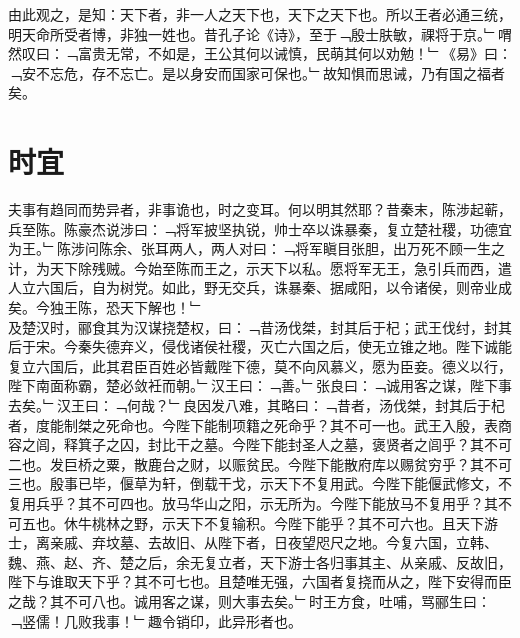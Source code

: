 由此观之，是知：天下者，非一人之天下也，天下之天下也。所以王者必通三统，明天命所受者博，非独一姓也。昔孔子论《诗》，至于﹁殷士肤敏，祼将于京。﹂喟然叹曰：﹁富贵无常，不如是，王公其何以诫慎，民萌其何以劝勉！﹂《易》曰：﹁安不忘危，存不忘亡。是以身安而国家可保也。﹂故知惧而思诫，乃有国之福者矣。
%
%
\chapter{时宜}%
夫事有趋同而势异者，非事诡也，时之变耳。何以明其然耶？昔秦末，陈涉起蕲，兵至陈。陈豪杰说涉曰：﹁将军披坚执锐，帅士卒以诛暴秦，复立楚社稷，功德宜为王。﹂陈涉问陈余、张耳两人，两人对曰：﹁将军瞋目张胆，出万死不顾一生之计，为天下除残贼。今始至陈而王之，示天下以私。愿将军无王，急引兵而西，遣人立六国后，自为树党。如此，野无交兵，诛暴秦、据咸阳，以令诸侯，则帝业成矣。今独王陈，恐天下解也！﹂\\
及楚汉时，郦食其为汉谋挠楚权，曰：﹁昔汤伐桀，封其后于杞；武王伐纣，封其后于宋。今秦失德弃义，侵伐诸侯社稷，灭亡六国之后，使无立锥之地。陛下诚能复立六国后，此其君臣百姓必皆戴陛下德，莫不向风慕义，愿为臣妾。德义以行，陛下南面称霸，楚必敛衽而朝。﹂汉王曰：﹁善。﹂张良曰：﹁诚用客之谋，陛下事去矣。﹂汉王曰：﹁何哉？﹂良因发八难，其略曰：﹁昔者，汤伐桀，封其后于杞者，度能制桀之死命也。今陛下能制项籍之死命乎？其不可一也。武王入殷，表商容之闾，释箕子之囚，封比干之墓。今陛下能封圣人之墓，褒贤者之闾乎？其不可二也。发巨桥之粟，散鹿台之财，以赈贫民。今陛下能散府库以赐贫穷乎？其不可三也。殷事已毕，偃草为轩，倒载干戈，示天下不复用武。今陛下能偃武修文，不复用兵乎？其不可四也。放马华山之阳，示无所为。今陛下能放马不复用乎？其不可五也。休牛桃林之野，示天下不复输积。今陛下能乎？其不可六也。且天下游士，离亲戚、弃坟墓、去故旧、从陛下者，日夜望咫尺之地。今复六国，立韩、魏、燕、赵、齐、楚之后，余无复立者，天下游士各归事其主、从亲戚、反故旧，陛下与谁取天下乎？其不可七也。且楚唯无强，六国者复挠而从之，陛下安得而臣之哉？其不可八也。诚用客之谋，则大事去矣。﹂时王方食，吐哺，骂郦生曰：﹁竖儒！几败我事！﹂趣令销印，此异形者也。
\\
